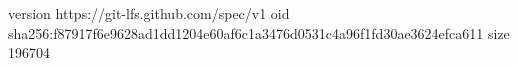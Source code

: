 version https://git-lfs.github.com/spec/v1
oid sha256:f87917f6e9628ad1dd1204e60af6c1a3476d0531c4a96f1fd30ae3624efca611
size 196704
